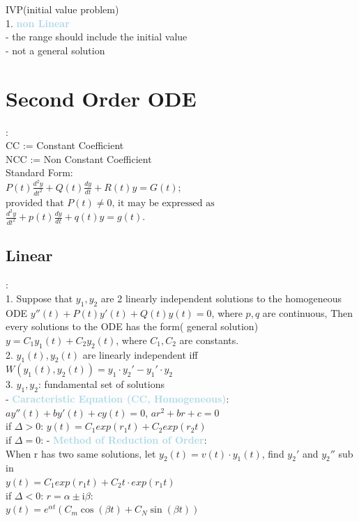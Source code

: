 \documentclass[twocolumn]{article}
\newcommand{\method}[1]{\textbf{\textcolor{lightblue}{#1}}}
\newcommand{\sectionspace}{\vspace*{1em}}
\newcommand{\properties}[1]{\textbf{\textcolor{rosered}{#1}}}
\begin{document}
 IVP(initial value problem)\\

1. \method{non Linear}\\
- the range should include the initial value\\
- not a general solution

\sectionspace

\section{Second Order ODE}
:\\
CC := Constant Coefficient\\
NCC := Non Constant Coefficient\\
Standard Form: \\ $
P(t) \frac{d^2y}{dt^2} + Q(t) \frac{dy}{dt} + R(t)y = G(t);$\\ 
$\text{provided that } P(t) \neq 0 \text{, it may be expressed as}$\\
$\frac{d^2y}{dt^2} + p(t) \frac{dy}{dt} + q(t)y = g(t).$

\sectionspace

\subsection{Linear}
:\\
1. Suppose that $ y_1, y_2 $ are 2 linearly independent 
solutions to the homogeneous ODE $y''(t)+ P(t)y'(t)+ Q(t)y(t) = 0$, where $p, q$ are continuous,
Then every solutions to the ODE has the form( general solution)
$y = C_1y_1(t) + C_2y_2(t)$, where $C_1, C_2$ are constants.\\
2. $y_1(t), y_2(t)$ are linearly independent iff\\
$W(y_1(t), y_2(t)) = y_1 \cdot y_2' - y_1' \cdot y_2$\\
3. $y_1, y_2$: fundamental set of solutions\\

- \method{Caracteristic Equation (\properties{CC, Homogeneous})}:\\
$ay''(t)+ by'(t)+ cy(t) = 0$, $ar^2 + br +  c  = 0$\\
if $\Delta > 0$: $y(t) =  C_1 exp(r_1t)+ C_2 exp(r_2t)$\\
if $\Delta = 0$:
- \method{Method of Reduction of Order}:\\
	When r has two same solutions, let $y_2(t) = v(t) \cdot y_1(t)$, find $y_2'$ and $y_2''$ sub in\\
	$y(t) =  C_1 exp(r_1t)+ C_2 t \cdot exp(r_1t)$\\
if $\Delta < 0$: $r = \alpha \pm \mathrm{i} \beta$:\\
$y(t) = e^{\alpha t} (C_m \cos(\beta t) + C_N \sin(\beta t))$\\
\end{document}
